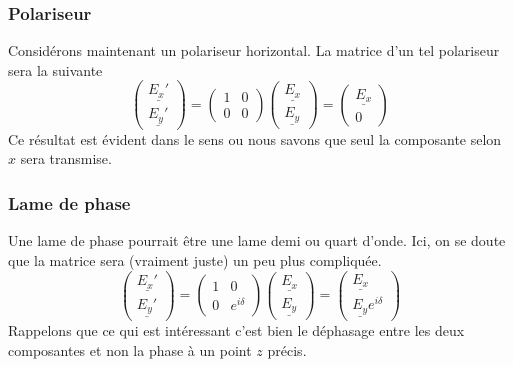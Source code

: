 \subsubsection{Polariseur}
Considérons maintenant un polariseur horizontal. La matrice d'un tel polariseur sera la suivante
\begin{equation}
\left(\begin{array}{c}
\underline{E_x'}\\
\underline{E_y'}
\end{array}\right) = \left(\begin{array}{cc}
1 & 0\\
0 & 0
\end{array}\right)\left(\begin{array}{c}
\underline{E_x}\\
\underline{E_y}
\end{array}\right) = \left(\begin{array}{c}
\underline{E_x}\\
0
\end{array}\right)
\end{equation}
Ce résultat est évident dans le sens ou nous savons que seul la composante selon $x$ sera transmise.
	
		\subsubsection{Lame de phase}
		Une lame de phase pourrait être une lame demi ou quart d'onde. Ici, on se doute que la matrice 
		sera (vraiment juste) un peu plus compliquée.
		\begin{equation}
		\left(\begin{array}{c}
		\underline{E_x'}\\
		\underline{E_y'}
		\end{array}\right) = \left(\begin{array}{cc}
		1 & 0\\
		0 & e^{i\delta}
		\end{array}\right)\left(\begin{array}{c}
		\underline{E_x}\\
		\underline{E_y}
		\end{array}\right)= \left(\begin{array}{c}
		\underline{E_x}\\
		\underline{E_y}e^{i\delta}
		\end{array}\right)
		\end{equation}
		Rappelons que ce qui est intéressant c'est bien le déphasage entre les deux composantes 
		et non la phase à un point $z$ précis.
		
